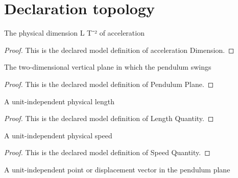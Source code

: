 \section{Declaration topology}
\begin{definition}
  \label{def:physics:phyx-mini-0692:phyxminiproblems-problemphyxmini0692-accelerationdimension}
  The physical dimension L T⁻² of acceleration
\end{definition}
\begin{proof}
  This is the declared model definition of acceleration Dimension.
\end{proof}
\begin{definition}
  \label{def:physics:phyx-mini-0692:phyxminiproblems-problemphyxmini0692-pendulumplane}
  The two-dimensional vertical plane in which the pendulum swings
\end{definition}
\begin{proof}
  This is the declared model definition of Pendulum Plane.
\end{proof}
\begin{definition}
  \label{def:physics:phyx-mini-0692:phyxminiproblems-problemphyxmini0692-lengthquantity}
  A unit-independent physical length
\end{definition}
\begin{proof}
  This is the declared model definition of Length Quantity.
\end{proof}
\begin{definition}
  \label{def:physics:phyx-mini-0692:phyxminiproblems-problemphyxmini0692-speedquantity}
  A unit-independent physical speed
\end{definition}
\begin{proof}
  This is the declared model definition of Speed Quantity.
\end{proof}
\begin{definition}
  \label{def:physics:phyx-mini-0692:phyxminiproblems-problemphyxmini0692-planarpositionquantity}
  A unit-independent point or displacement vector in the pendulum plane
\end{definition}
